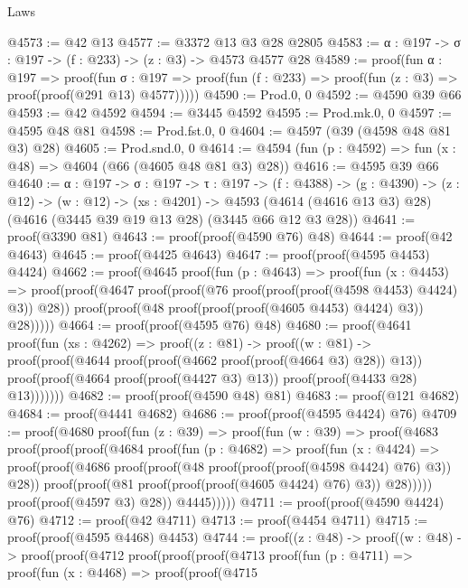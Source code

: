 \begin{lexlean}{Laws}
\begin{coremodule}
@4573 := @42 @13
@4577 := @3372 @13 @3 @28 @2805
@4583 := {α : @197} -> {σ : @197} -> (f : @233) -> (z : @3) -> @4573 @4577 @28
@4589 := proof(fun {α : @197} =>
    proof(fun {σ : @197} =>
      proof(fun (f : @233) => proof(fun (z : @3) => proof(proof(@291 @13) @4577)))))
@4590 := Prod.{0, 0}
@4592 := @4590 @39 @66
@4593 := @42 @4592
@4594 := @3445 @4592
@4595 := Prod.mk.{0, 0}
@4597 := @4595 @48 @81
@4598 := Prod.fst.{0, 0}
@4604 := @4597 (@39 (@4598 @48 @81 @3) @28)
@4605 := Prod.snd.{0, 0}
@4614 := @4594 (fun (p : @4592) => fun (x : @48) => @4604 (@66 (@4605 @48 @81 @3) @28))
@4616 := @4595 @39 @66
@4640 := {α : @197} ->
  {σ : @197} ->
  {τ : @197} ->
  (f : @4388) ->
  (g : @4390) ->
  (z : @12) ->
  (w : @12) ->
  (xs : @4201) ->
  @4593 (@4614 (@4616 @13 @3) @28) (@4616 (@3445 @39 @19 @13 @28) (@3445 @66 @12 @3 @28))
@4641 := proof(@3390 @81)
@4643 := proof(proof(@4590 @76) @48)
@4644 := proof(@42 @4643)
@4645 := proof(@4425 @4643)
@4647 := proof(proof(@4595 @4453) @4424)
@4662 := proof(@4645
      proof(fun (p : @4643) =>
        proof(fun (x : @4453) =>
          proof(proof(@4647 proof(proof(@76 proof(proof(proof(@4598 @4453) @4424) @3)) @28))
              proof(proof(@48 proof(proof(proof(@4605 @4453) @4424) @3)) @28)))))
@4664 := proof(proof(@4595 @76) @48)
@4680 := proof(@4641
      proof(fun (xs : @4262) =>
        proof((z : @81) ->
          proof((w : @81) ->
            proof(proof(@4644 proof(proof(@4662 proof(proof(@4664 @3) @28)) @13))
                proof(proof(@4664 proof(proof(@4427 @3) @13)) proof(proof(@4433 @28) @13)))))))
@4682 := proof(proof(@4590 @48) @81)
@4683 := proof(@121 @4682)
@4684 := proof(@4441 @4682)
@4686 := proof(proof(@4595 @4424) @76)
@4709 := proof(@4680
      proof(fun (z : @39) =>
        proof(fun (w : @39) =>
          proof(@4683
              proof(proof(proof(@4684
                      proof(fun (p : @4682) =>
                        proof(fun (x : @4424) =>
                          proof(proof(@4686
                                proof(proof(@48 proof(proof(proof(@4598 @4424) @76) @3)) @28))
                              proof(proof(@81 proof(proof(proof(@4605 @4424) @76) @3)) @28)))))
                    proof(proof(@4597 @3) @28))
                  @4445)))))
@4711 := proof(proof(@4590 @4424) @76)
@4712 := proof(@42 @4711)
@4713 := proof(@4454 @4711)
@4715 := proof(proof(@4595 @4468) @4453)
@4744 := proof((z : @48) ->
    proof((w : @48) ->
      proof(proof(@4712
            proof(proof(proof(@4713
                    proof(fun (p : @4711) =>
                      proof(fun (x : @4468) =>
                        proof(proof(@4715

\end{coremodule}
\end{lexlean}
